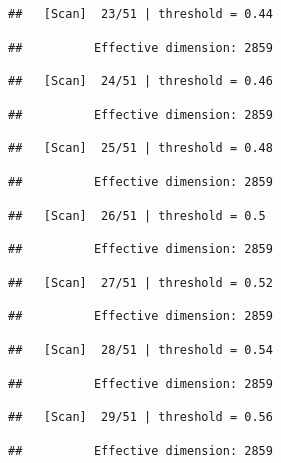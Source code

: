 \documentclass[
]{book}
\begin{document}
\begin{verbatim}
##   [Scan]  23/51 | threshold = 0.44
\end{verbatim}

\begin{verbatim}
##          Effective dimension: 2859
\end{verbatim}

\begin{verbatim}
##   [Scan]  24/51 | threshold = 0.46
\end{verbatim}

\begin{verbatim}
##          Effective dimension: 2859
\end{verbatim}

\begin{verbatim}
##   [Scan]  25/51 | threshold = 0.48
\end{verbatim}

\begin{verbatim}
##          Effective dimension: 2859
\end{verbatim}

\begin{verbatim}
##   [Scan]  26/51 | threshold = 0.5
\end{verbatim}

\begin{verbatim}
##          Effective dimension: 2859
\end{verbatim}

\begin{verbatim}
##   [Scan]  27/51 | threshold = 0.52
\end{verbatim}

\begin{verbatim}
##          Effective dimension: 2859
\end{verbatim}

\begin{verbatim}
##   [Scan]  28/51 | threshold = 0.54
\end{verbatim}

\begin{verbatim}
##          Effective dimension: 2859
\end{verbatim}

\begin{verbatim}
##   [Scan]  29/51 | threshold = 0.56
\end{verbatim}

\begin{verbatim}
##          Effective dimension: 2859
\end{verbatim}
\end{document}
